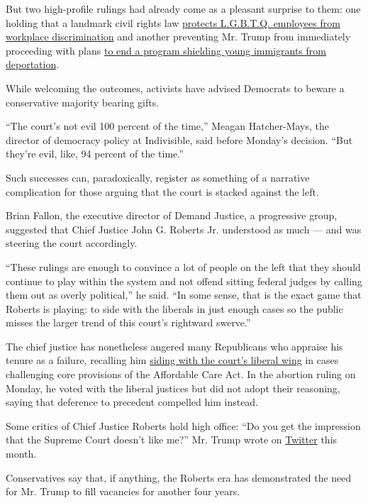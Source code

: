 But two high-profile rulings had already come as a pleasant surprise to
them: one holding that a landmark civil rights law
\href{https://www.nytimes.com/2020/06/15/us/gay-transgender-workers-supreme-court.html}{protects
L.G.B.T.Q. employees from workplace discrimination} and another
preventing Mr. Trump from immediately proceeding with plans
\href{https://www.nytimes.com/2020/06/18/us/trump-daca-supreme-court.html}{to
end a program shielding young immigrants from deportation}.

While welcoming the outcomes, activists have advised Democrats to beware
a conservative majority bearing gifts.

``The court's not evil 100 percent of the time,'' Meagan Hatcher-Mays,
the director of democracy policy at Indivisible, said before Monday's
decision. ``But they're evil, like, 94 percent of the time.''

Such successes can, paradoxically, register as something of a narrative
complication for those arguing that the court is stacked against the
left.

Brian Fallon, the executive director of Demand Justice, a progressive
group, suggested that Chief Justice John G. Roberts Jr. understood as
much --- and was steering the court accordingly.

``These rulings are enough to convince a lot of people on the left that
they should continue to play within the system and not offend sitting
federal judges by calling them out as overly political,'' he said. ``In
some sense, that is the exact game that Roberts is playing: to side with
the liberals in just enough cases so the public misses the larger trend
of this court's rightward swerve.''

The chief justice has nonetheless angered many Republicans who appraise
his tenure as a failure, recalling him
\href{https://www.nytimes.com/2012/06/29/us/supreme-court-lets-health-law-largely-stand.html}{siding
with the court's liberal wing} in cases challenging core provisions of
the Affordable Care Act. In the abortion ruling on Monday, he voted with
the liberal justices but did not adopt their reasoning, saying that
deference to precedent compelled him instead.

Some critics of Chief Justice Roberts hold high office: ``Do you get the
impression that the Supreme Court doesn't like me?'' Mr. Trump wrote on
\href{https://twitter.com/realdonaldtrump/status/1273634152433188865}{Twitter}
this month.

Conservatives say that, if anything, the Roberts era has demonstrated
the need for Mr. Trump to fill vacancies for another four years.

